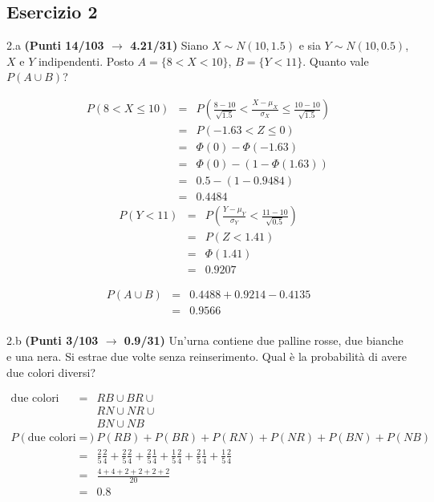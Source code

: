 \documentclass[
  11pt,
]{book}
\theoremstyle{mytheoremstyle}
\theoremstyle{mydefstyle}
\newenvironment{sol}
  {
  \begin{tcolorbox}[enhanced,breakable,arc=0.1mm,boxrule=1pt,colback=white,colframe=iblue,
  title=\bf \fontfamily{lmss}\selectfont \hspace{.5 cm} Soluzione,drop fuzzy shadow]

}{
\end{tcolorbox}
  }
\begin{document}
\subsection{Esercizio 2}\label{esercizio-2-20}

2.a \textbf{(Punti 14/103 \(\rightarrow\) 4.21/31)} Siano \(X\sim N(10,1.5)\) e sia \(Y\sim N(10,0.5)\), \(X\) e \(Y\) indipendenti. Posto \(A=\{8<X<10\}\), \(B=\{Y<11\}\).
Quanto vale \(P(A\cup B)\)?

\begin{sol}
\begin{eqnarray*}
   P( 8 < X \leq  10 ) &=& P\left( \frac { 8  -  10 }{\sqrt{ 1.5 }} < \frac { X  -  \mu_X }{ \sigma_X } \leq \frac { 10  -  10 }{\sqrt{ 1.5 }}\right)  \\
              &=& P\left(  -1.63  < Z \leq  0 \right) \\
              &=& \Phi( 0 )-\Phi( -1.63 )\\
              &=&  \Phi( 0 )-(1-\Phi( 1.63 )) \\ &=&  0.5 -(1- 0.9484 ) \\ 
              &=&  0.4484 
   \end{eqnarray*}
\begin{eqnarray*}
      P( Y   <   11 ) 
        &=& P\left(  \frac { Y  -  \mu_Y }{ \sigma_Y }  <  \frac { 11  -  10 }{\sqrt{ 0.5 }} \right)  \\
                 &=& P\left(  Z   <   1.41 \right) \\    
                 &=&  \Phi( 1.41 ) \\ &=&  0.9207 
      \end{eqnarray*}

\begin{eqnarray*}
  P(A\cup B) &=&  0.4488+ 0.9214-0.4135\\
             &=&  0.9566\\
\end{eqnarray*}

\end{sol}

2.b \textbf{(Punti 3/103 \(\rightarrow\) 0.9/31)} Un'urna contiene due palline rosse, due bianche e una nera. Si estrae due volte senza reinserimento. Qual è la probabilità di avere due colori diversi?

\begin{sol}
\begin{eqnarray*}
  \text{due colori diversi} &=& RB\cup BR \cup\\
                            &&  RN\cup NR \cup\\
                            &&  BN\cup NB\\
  P(\text{due colori diversi}) &=& P(RB)+P(BR)+P(RN)+P(NR)+P(BN)+P(NB)\\
  &=& \frac 25\frac 24+\frac 25\frac 24+\frac 25\frac 14+\frac 15\frac 24+\frac 25\frac 14+\frac 15\frac 24\\
  &=& \frac{4+4+2+2+2+2}{20}\\
  &=& 0.8
\end{eqnarray*}

\end{sol}
\end{document}
